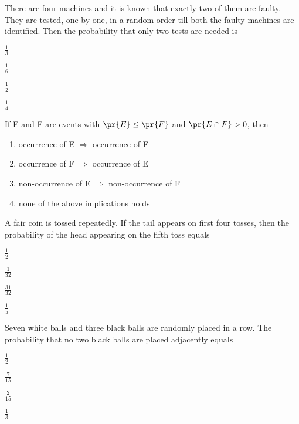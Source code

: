 \item There are four machines and it is known that exactly two of them are faulty. They are tested, one by one, in a random order till both the faulty machines are identified. Then the probability that only two tests are needed is
\hfill{}
\begin{enumerate}
\begin{multicols}{4}
\item $\frac{1}{3}$
\item $\frac{1}{6}$
\item $\frac{1}{2}$
\item $\frac{1}{4}$
\end{multicols}
\end{enumerate}
\item If E and F are events with $\pr{E} \leq \pr{F}$ and $\pr{E\cap F}>0$, then
\hfill{}
\begin{enumerate}
\item occurrence of E $\Rightarrow$ occurrence of F
\item occurrence of F $\Rightarrow$ occurrence of E
\item non-occurrence of E $\Rightarrow$ non-occurrence of F
\item none of the above implications holds
\end{enumerate}
\item A fair coin is tossed repeatedly. If the tail appears on first four tosses, then the probability of the head appearing on the fifth toss equals
\hfill{}
\begin{enumerate}
\begin{multicols}{4}
\item $\frac{1}{2}$
\item $\frac{1}{32}$
\item $\frac{31}{32}$
\item $\frac{1}{5}$
\end{multicols}
\end{enumerate}
\item Seven white balls and three black balls are randomly placed in a row. The probability that no two black balls are placed adjacently equals
\hfill{}
\begin{enumerate}
\begin{multicols}{4}
\item $\frac{1}{2}$
\item $\frac{7}{15}$
\item $\frac{2}{15}$
\item $\frac{1}{3}$
\end{multicols}
\end{enumerate}
